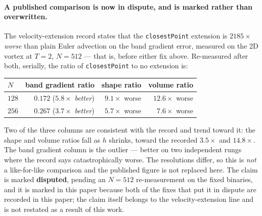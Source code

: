 \documentclass[preprint,3p,11pt]{elsarticle}
\begin{document}
\paragraph{A published comparison is now in dispute, and is marked rather than
overwritten.} The velocity-extension record states that the \texttt{closestPoint}
extension is $2185\times$ \emph{worse} than plain Euler advection on the band
gradient error, measured on the 2D vortex at $T=2$, $N=512$ --- that is, before
either fix above. Re-measured after both, serially, the ratio of
\texttt{closestPoint} to no extension is:
\begin{center}
\begin{tabular}{lrrr}
\toprule
$N$ & band gradient ratio & shape ratio & volume ratio \\
\midrule
$128$ & $0.172$ \quad($5.8\times$ \emph{better}) & $9.1\times$ worse & $12.6\times$ worse \\
$256$ & $0.267$ \quad($3.7\times$ \emph{better}) & $5.7\times$ worse & $7.6\times$ worse \\
\bottomrule
\end{tabular}
\end{center}
Two of the three columns are consistent with the record and trend toward it: the
shape and volume ratios fall as $h$ shrinks, toward the recorded $3.5\times$ and
$14.8\times$. The band gradient column is the outlier --- better on two
independent rungs where the record says catastrophically worse. The resolutions
differ, so this is \emph{not} a like-for-like comparison and the published figure
is not replaced here. The claim is marked \textbf{disputed}, pending an $N=512$
re-measurement on the fixed binaries, and it is marked in this paper because both
of the fixes that put it in dispute are recorded in this paper; the claim itself
belongs to the velocity-extension line and is not restated as a result of this
work.
\end{document}
